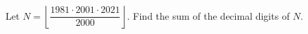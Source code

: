Let $N=\left\lfloor\dfrac{1981\cdot2001\cdot2021}{2000}\right\rfloor$. Find the sum of the decimal digits of $N$.
